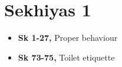 \chapter{Sekhiyas 1}

\begin{itemize}
\tightlist
\item
  \textbf{Sk 1-27,} Proper behaviour
\item
  \textbf{Sk 73-75,} Toilet etiquette
\end{itemize}

